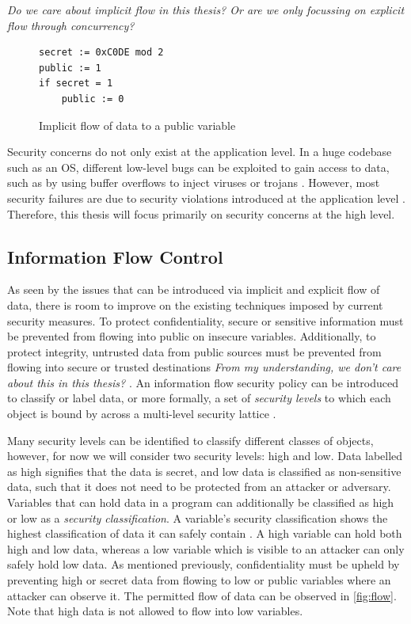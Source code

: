 \documentclass[twocolumn]{article}
\begin{document}
\textit{Do we care about implicit flow in this thesis? Or are we only focussing on explicit flow through concurrency?}


\begin{figure}
    \begin{lstlisting}
secret := 0xC0DE mod 2
public := 1
if secret = 1
    public := 0
        \end{lstlisting}
    \caption{Implicit flow of data to a public variable}
    \label{fig:implicit}
\end{figure}

Security concerns do not only exist at the application level. In a huge codebase such as an OS, different low-level bugs can be exploited to gain access to data, such as by using buffer overflows to inject viruses or trojans \cite{agten2012recent}. However, most security failures are due to security violations introduced at the application level \cite{jang2010empirical}. Therefore, this thesis will focus primarily on security concerns at the high level.

\subsection{Information Flow Control}
As seen by the issues that can be introduced via implicit and explicit flow of data, there is room to improve on the existing techniques imposed by current security measures. To protect confidentiality, secure or sensitive information must be prevented from flowing into public on insecure variables. Additionally, to protect integrity, untrusted data from public sources must be prevented from flowing into secure or trusted destinations \textit{From my understanding, we don't care about this in this thesis?} \cite{balliu2014logics}. An information flow security policy can be introduced to classify or label data, or more formally, a set of \textit{security levels} to which each object is bound by across a multi-level security lattice \cite{denning1976lattice}.

Many security levels can be identified to classify different classes of objects, however, for now we will consider two security levels: high and low. Data labelled as high signifies that the data is secret, and low data is classified as non-sensitive data, such that it does not need to be protected from an attacker or adversary. Variables that can hold data in a program can additionally be classified as high or low as a \textit{security classification}. A variable's security classification shows the highest classification of data it can safely contain \cite{winter2020information}. A high variable can hold both high and low data, whereas a low variable which is visible to an attacker can only safely hold low data. As mentioned previously, confidentiality must be upheld by preventing high or secret data from flowing to low or public variables where an attacker can observe it. The permitted flow of data can be observed in \ref{fig:flow}. Note that high data is not allowed to flow into low variables.
\end{document}
